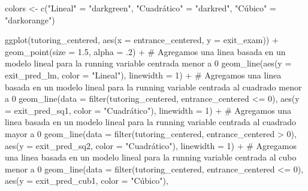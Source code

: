 \documentclass[
  letterpaper,
  DIV=11,
  numbers=noendperiod,
  oneside]{scrreprt}
\newenvironment{Shaded}{\begin{snugshade}}{\end{snugshade}}
\newcommand{\AttributeTok}[1]{\textcolor[rgb]{0.40,0.45,0.13}{#1}}
\newcommand{\CommentTok}[1]{\textcolor[rgb]{0.37,0.37,0.37}{#1}}
\newcommand{\DecValTok}[1]{\textcolor[rgb]{0.68,0.00,0.00}{#1}}
\newcommand{\FloatTok}[1]{\textcolor[rgb]{0.68,0.00,0.00}{#1}}
\newcommand{\FunctionTok}[1]{\textcolor[rgb]{0.28,0.35,0.67}{#1}}
\newcommand{\NormalTok}[1]{\textcolor[rgb]{0.00,0.23,0.31}{#1}}
\newcommand{\OtherTok}[1]{\textcolor[rgb]{0.00,0.23,0.31}{#1}}
\newcommand{\SpecialCharTok}[1]{\textcolor[rgb]{0.37,0.37,0.37}{#1}}
\newcommand{\StringTok}[1]{\textcolor[rgb]{0.13,0.47,0.30}{#1}}
\begin{document}
\begin{Shaded}
\begin{Highlighting}[]
\NormalTok{colors }\OtherTok{\textless{}{-}} \FunctionTok{c}\NormalTok{(}\StringTok{"Lineal"} \OtherTok{=} \StringTok{"darkgreen"}\NormalTok{, }
            \StringTok{"Cuadrático"} \OtherTok{=} \StringTok{"darkred"}\NormalTok{, }
            \StringTok{"Cúbico"} \OtherTok{=} \StringTok{"darkorange"}\NormalTok{)}

\FunctionTok{ggplot}\NormalTok{(tutoring\_centered, }\FunctionTok{aes}\NormalTok{(}\AttributeTok{x =}\NormalTok{ entrance\_centered, }
                     \AttributeTok{y =}\NormalTok{ exit\_exam)) }\SpecialCharTok{+}
  \FunctionTok{geom\_point}\NormalTok{(}\AttributeTok{size =} \FloatTok{1.5}\NormalTok{, }\AttributeTok{alpha =}\NormalTok{ .}\DecValTok{2}\NormalTok{) }\SpecialCharTok{+} 
  \CommentTok{\# Agregamos una linea basada en un modelo lineal para la running variable centrada menor a 0}
  \FunctionTok{geom\_line}\NormalTok{(}\FunctionTok{aes}\NormalTok{(}\AttributeTok{y =}\NormalTok{ exit\_pred\_lm, }\AttributeTok{color =} \StringTok{"Lineal"}\NormalTok{), }\AttributeTok{linewidth =} \DecValTok{1}\NormalTok{) }\SpecialCharTok{+}
  \CommentTok{\# Agregamos una linea basada en un modelo lineal para la running variable centrada al cuadrado menor a 0}
  \FunctionTok{geom\_line}\NormalTok{(}\AttributeTok{data =} \FunctionTok{filter}\NormalTok{(tutoring\_centered, entrance\_centered }\SpecialCharTok{\textless{}=} \DecValTok{0}\NormalTok{), }\FunctionTok{aes}\NormalTok{(}\AttributeTok{y =}\NormalTok{ exit\_pred\_sq1, }\AttributeTok{color =} \StringTok{"Cuadrático"}\NormalTok{), }
            \AttributeTok{linewidth =} \DecValTok{1}\NormalTok{) }\SpecialCharTok{+}
  \CommentTok{\# Agregamos una linea basada en un modelo lineal para la running variable centrada al cuadrado mayor a 0}
  \FunctionTok{geom\_line}\NormalTok{(}\AttributeTok{data =} \FunctionTok{filter}\NormalTok{(tutoring\_centered, entrance\_centered }\SpecialCharTok{\textgreater{}} \DecValTok{0}\NormalTok{), }\FunctionTok{aes}\NormalTok{(}\AttributeTok{y =}\NormalTok{ exit\_pred\_sq2, }\AttributeTok{color =} \StringTok{"Cuadrático"}\NormalTok{), }
            \AttributeTok{linewidth =} \DecValTok{1}\NormalTok{) }\SpecialCharTok{+}
    \CommentTok{\# Agregamos una linea basada en un modelo lineal para la running variable centrada al cubo menor a 0}
  \FunctionTok{geom\_line}\NormalTok{(}\AttributeTok{data =} \FunctionTok{filter}\NormalTok{(tutoring\_centered, entrance\_centered }\SpecialCharTok{\textless{}=} \DecValTok{0}\NormalTok{), }\FunctionTok{aes}\NormalTok{(}\AttributeTok{y =}\NormalTok{ exit\_pred\_cub1, }\AttributeTok{color =} \StringTok{"Cúbico"}\NormalTok{), }

\end{Highlighting}
\end{Shaded}
\end{document}
